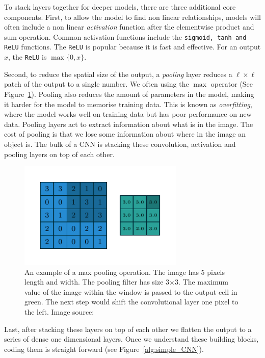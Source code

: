\documentclass[12pt, a4paper, oneside, headinclude, footinclude]{article}
\begin{document}
To stack layers together for deeper models, there are three  additional core
components. First, to allow the model to find non linear relationships, models
will often include a non linear \textit{activation} function after the
elementwise product and sum operation. Common activation functions include the
\texttt{sigmoid, tanh and ReLU} functions. The \texttt{ReLU} is popular
because it is fast and effective. For an output $x$, the \texttt{ReLU} is
$\max\{0, x\}$.

Second, to reduce the spatial size of the output, a \textit{pooling} layer
reduces a $\ell\times\ell$ patch of the output to a single number. We often
using the $\max$ operator (See Figure~\ref{fig:maxpooling}). Pooling also reduces
the amount of parameters in the model, making it harder for the model to
memorise training data. This is known as \textit{overfitting}, where the model
works well on training data but has poor performance on new data. Pooling
layers act to extract information about what is in the image. The cost of
pooling is that we lose some information about where in the image an object
is. The bulk of a CNN is stacking these convolution, activation and pooling
layers on top of each other.

\begin{figure}
	\centering
    \includegraphics[width=0.7\textwidth]{numerical_max_pooling_02.pdf}
    \caption[A max pooling operation] {An example of a max pooling operation.
    The image has 5 pixels length and width. The pooling filter has size
    3$\times$3. The maximum value of the image within the window is passed to
    the output cell in green. The next step would shift the convolutional
    layer one pixel to the left. Image source: ~\cite{dumoulin2016guide}
    \label{fig:maxpooling}}
\end{figure}

Last, after stacking these layers on top of each other we flatten the
output to a series of dense one dimensional layers. Once we understand these
building blocks, coding them is straight forward (see
Figure~\ref{alg:simple_CNN}).
\end{document}
